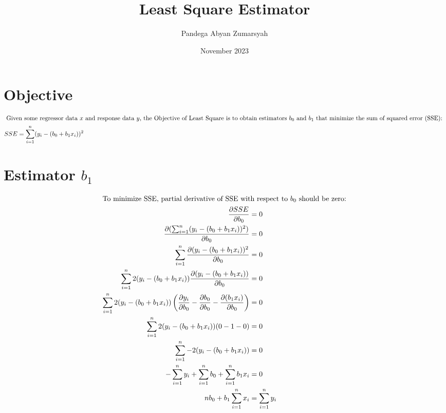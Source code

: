 \documentclass{article}
\title{Least Square Estimator}
\author{Pandega Abyan Zumarsyah}
\date{November 2023}
\begin{document}
\maketitle

\section*{Objective}
\begin{gather*}
    \intertext{
        Given some regressor data $x$ and response data $y$,
        the Objective of Least Square is to obtain estimators $b_0$ and $b_1$
        that minimize the sum of squared error (SSE):
    }
    SSE = \sum_{i=1}^n (y_i - (b_0 + b_1 x_i))^2
\end{gather*}

\section*{Estimator $b_1$}
\begin{align*}
    \intertext{To minimize SSE, partial derivative of SSE with respect to $b_0$ should be zero:}
    \frac{\partial SSE}{\partial b_0}                                                            & = 0                \\
    \frac{\partial (\sum_{i=1}^n (y_i - (b_0 + b_1 x_i))^2)}{\partial b_0}                       & = 0                \\
    \sum_{i=1}^n \frac{\partial (y_i - (b_0 + b_1 x_i))^2}{\partial b_0}                         & = 0                \\
    \sum_{i=1}^n 2 (y_i - (b_0 + b_1 x_i)) \frac{\partial (y_i - (b_0 + b_1 x_i))}{\partial b_0} & = 0                \\
    \sum_{i=1}^n 2 (y_i - (b_0 + b_1 x_i)) \left(
    \frac{\partial y_i}{\partial b_0} - \frac{\partial b_0}{\partial b_0} - \frac{\partial (b_1 x_i)}{\partial b_0}
    \right)                                                                                      & = 0                \\
    \sum_{i=1}^n 2 (y_i - (b_0 + b_1 x_i)) (0 - 1 - 0)                                           & = 0                \\
    \sum_{i=1}^n -2 (y_i - (b_0 + b_1 x_i))                                                      & = 0                \\
    - \sum_{i=1}^n y_i + \sum_{i=1}^n b_0 + \sum_{i=1}^n b_1 x_i                                 & = 0                \\
    n b_0 + b_1 \sum_{i=1}^n x_i                                                                 & = \sum_{i=1}^n y_i
\end{align*}
\end{document}
